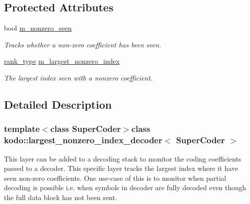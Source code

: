 \subsection*{Protected Attributes}
\begin{DoxyCompactItemize}
\item 
\hypertarget{classkodo_1_1largest__nonzero__index__decoder_a2e2e0710f40c863dbcec68565be3e8be}{bool \hyperlink{classkodo_1_1largest__nonzero__index__decoder_a2e2e0710f40c863dbcec68565be3e8be}{m\-\_\-nonzero\-\_\-seen}}\label{classkodo_1_1largest__nonzero__index__decoder_a2e2e0710f40c863dbcec68565be3e8be}

\begin{DoxyCompactList}\small\item\em Tracks whether a non-\/zero coefficient has been seen. \end{DoxyCompactList}\item 
\hypertarget{classkodo_1_1largest__nonzero__index__decoder_aca0dd4f58be2f2fd44b5aa18f4ddddc8}{\hyperlink{classkodo_1_1largest__nonzero__index__decoder_a27df8d24f0a91c14f8143d8a88205e7a}{rank\-\_\-type} \hyperlink{classkodo_1_1largest__nonzero__index__decoder_aca0dd4f58be2f2fd44b5aa18f4ddddc8}{m\-\_\-largest\-\_\-nonzero\-\_\-index}}\label{classkodo_1_1largest__nonzero__index__decoder_aca0dd4f58be2f2fd44b5aa18f4ddddc8}

\begin{DoxyCompactList}\small\item\em The largest index seen with a nonzero coefficient. \end{DoxyCompactList}\end{DoxyCompactItemize}


\subsection{Detailed Description}
\subsubsection*{template$<$class Super\-Coder$>$class kodo\-::largest\-\_\-nonzero\-\_\-index\-\_\-decoder$<$ Super\-Coder $>$}

This layer can be added to a decoding stack to monitor the coding coefficients passed to a decoder. This specific layer tracks the largest index where it have seen non-\/zero coefficients. One use-\/case of this is to monitor when partial decoding is possible i.\-e. when symbols in decoder are fully decoded even though the full data block has not been sent. 

